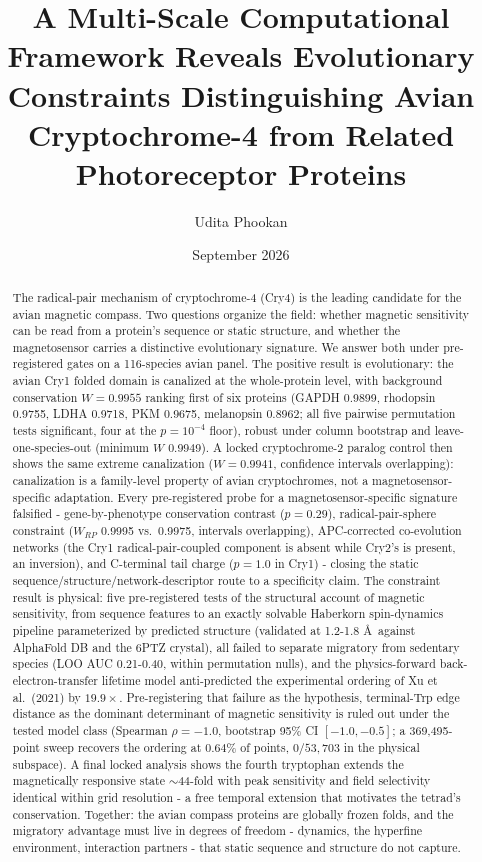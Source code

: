 \documentclass[12pt,a4paper]{article}
\title{A Multi-Scale Computational Framework Reveals Evolutionary Constraints Distinguishing Avian Cryptochrome-4 from Related Photoreceptor Proteins}
\author{Udita Phookan}
\date{September 2026}
\begin{document}
\maketitle
\begin{abstract}
The radical-pair mechanism of cryptochrome-4 (Cry4) is the leading candidate for the avian magnetic compass. Two questions organize the field: whether magnetic sensitivity can be read from a protein's sequence or static structure, and whether the magnetosensor carries a distinctive evolutionary signature. We answer both under pre-registered gates on a 116-species avian panel. The positive result is evolutionary: the avian Cry1 folded domain is canalized at the whole-protein level, with background conservation $W=0.9955$ ranking first of six proteins (GAPDH 0.9899, rhodopsin 0.9755, LDHA 0.9718, PKM 0.9675, melanopsin 0.8962; all five pairwise permutation tests significant, four at the $p=10^{-4}$ floor), robust under column bootstrap and leave-one-species-out (minimum $W$ 0.9949). A locked cryptochrome-2 paralog control then shows the same extreme canalization ($W=0.9941$, confidence intervals overlapping): canalization is a family-level property of avian cryptochromes, not a magnetosensor-specific adaptation. Every pre-registered probe for a magnetosensor-specific signature falsified - gene-by-phenotype conservation contrast ($p=0.29$), radical-pair-sphere constraint ($W_{RP}$ 0.9995 vs.\ 0.9975, intervals overlapping), APC-corrected co-evolution networks (the Cry1 radical-pair-coupled component is absent while Cry2's is present, an inversion), and C-terminal tail charge ($p=1.0$ in Cry1) - closing the static sequence/structure/network-descriptor route to a specificity claim. The constraint result is physical: five pre-registered tests of the structural account of magnetic sensitivity, from sequence features to an exactly solvable Haberkorn spin-dynamics pipeline parameterized by predicted structure (validated at 1.2-1.8 \AA\ against AlphaFold DB and the 6PTZ crystal), all failed to separate migratory from sedentary species (LOO AUC 0.21-0.40, within permutation nulls), and the physics-forward back-electron-transfer lifetime model anti-predicted the experimental ordering of Xu et al.\ (2021) by $19.9\times$. Pre-registering that failure as the hypothesis, terminal-Trp edge distance as the dominant determinant of magnetic sensitivity is ruled out under the tested model class (Spearman $\rho=-1.0$, bootstrap 95\% CI $[-1.0,-0.5]$; a 369{,}495-point sweep recovers the ordering at $0.64\%$ of points, $0/53{,}703$ in the physical subspace). A final locked analysis shows the fourth tryptophan extends the magnetically responsive state $\sim$44-fold with peak sensitivity and field selectivity identical within grid resolution - a free temporal extension that motivates the tetrad's conservation. Together: the avian compass proteins are globally frozen folds, and the migratory advantage must live in degrees of freedom - dynamics, the hyperfine environment, interaction partners - that static sequence and structure do not capture.
\end{abstract}
\end{document}

